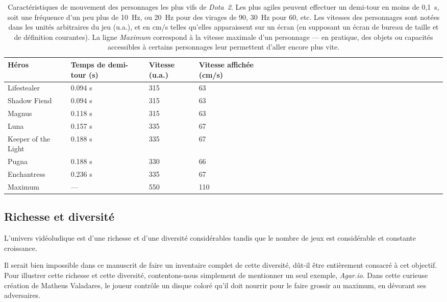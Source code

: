 	\newcommand{\newrow}{\bigstrut[t] \\ \hline}
	\begin{table}[!htbp]
		\centering
		\begin{tabularx}{\textwidth}{ Y X X X } %
		Héros				&	Temps de demi-tour (s)	&	Vitesse (u.a.)	&	Vitesse affichée (cm/s)	\newrow
		Lifestealer			&	0.094 s					&	315				&	63						\newrow
		Shadow Fiend		&	0.094 s					&	315				&	63						\newrow
		Magnus				&	0.118 s					&	315				&	63						\newrow
		Luna				&	0.157 s					&	335				&	67						\newrow
		Keeper of the Light	&	0.188 s					&	335				&	67						\newrow
		Pugna				&	0.188 s					&	330				&	66						\newrow
		Enchantress			&	0.236 s					&	335				&	67						\newrow
		\og Maximum \fg{}	&	---						&	550				&	110						\newrow
		\end{tabularx}
		\caption[Caractéristiques de mouvement des personnages vifs de \emph{Dota~2}]{Caractéristiques de mouvement des personnages les plus vifs de \emph{Dota~2}. Les plus \og agiles \fg{} peuvent effectuer un demi-tour en moins de 0,1~s, soit une fréquence d'un peu plus de 10~Hz, ou 20~Hz pour des virages de 90\textdegree, 30~Hz pour 60\textdegree, etc. Les vitesses des personnages sont notées dans les unités arbitraires du jeu (u.a.), et en cm/s telles qu'elles apparaissent sur un écran (en supposant un écran de bureau de taille et de définition courantes). La ligne \emph{Maximum} correspond à la vitesse \og maximale \fg{} d'un personnage --- en pratique, des objets ou capacités accessibles à certains personnages leur permettent d'aller encore plus vite.}
		\label{tab:dotamoves}
	\end{table}
	
	\FloatBarrier \subsection{Richesse et diversité}
	L'univers vidéoludique est d'une richesse et d'une diversité considérables tandis que le nombre de jeux est considérable et constante croissance. 
	
	Il serait bien impossible dans ce manuscrit de faire un inventaire complet de cette diversité, dût-il être entièrement consacré à cet objectif. Pour illustrer cette richesse et cette diversité, contentons-nous simplement de mentionner un seul exemple, \emph{Agar.io}. Dans cette curieuse création de Matheus Valadares, le joueur contrôle un disque coloré qu'il doit nourrir pour le faire grossir au maximum, en dévorant ses adversaires.
	
